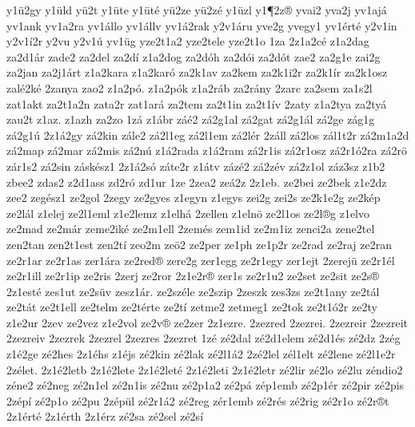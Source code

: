 {y1^^fc2gy
y1^^fcld
y^^fc2t
y1^^fcte
y1^^fct^^e9
y^^fc2ze
y^^fc2z^^e9
y1^^fczl
y1^^b62z^^ae
yvai2
yva2j
yv1aj^^e1
yv1ank
yv1a2ra
yv1^^e1llo
yv1^^e1llv
yv1^^e12rak
y2v1^^e1ru
yve2g
yvegy1
yv1^^e9rt^^e9
y2v1in
y2v1^^ed2r
y2vu
y2v1^^fa
yv1^^fcg
yze2t1a2
yze2tele
yze2t1o
1za
2z1a2c^^e9
z1a2dag
za2d1^^e1r
zade2
za2del
za2d^^ed
z1a2dog
za2d^^f3h
za2d^^f3i
za2d^^f3t
zae2
za2g1e
zai2g
za2jan
za2j1^^e1rt
z1a2kara
z1a2kar^^f3
za2k1av
za2kem
za2k1i2r
za2k1^^edr
za2k1osz
zal^^e92k^^e9
2zanya
zao2
z1a2p^^f3.
z1a2p^^f3k
z1a2r^^e1b
za2r^^e1ny
2zarc
za2sem
za1s2l
zat1akt
za2t1a2n
zata2r
zat1ar^^e1
za2tem
za2t1in
za2t1^^edv
2zaty
z1a2tya
za2ty^^e1
zau2t
z1az.
z1azh
za2zo
1z^^e1
z1^^e1br
z^^e1^^e92
z^^e12g1al
z^^e12gat
z^^e12g1^^e1l
z^^e12ge
z^^e1g1g
z^^e12g1^^fa
2z1^^e12gy
z^^e12kin
z^^e1le2
z^^e12l1eg
z^^e12l1em
z^^e12l^^e9r
2z^^e1ll
z^^e12los
z^^e1l1t2r
z^^e12m1a2d
z^^e12map
z^^e12mar
z^^e12mis
z^^e12n^^fa
z1^^e12rada
z1^^e12ram
z^^e12r1is
z^^e12r1osz
z^^e12r1^^f32ra
z^^e12r^^f6
z^^e1r1s2
z^^e12sin
z^^e1sk^^e9sz1
2z1^^e12s^^f3
z^^e1te2r
z1^^e1tv
z^^e1z^^e92
z^^e12z^^e9v
z^^e12z1ol
z^^e1z3sz
z1b2
zbee2
zdas2
z2d1ass
zd2r^^f3
zd1ur
1ze
2zea2
ze^^e12z
2z1eb.
ze2bei
ze2bek
z1e2dz
zee2
zeg^^e9sz1
ze2gol
2zegy
ze2gyes
z1egyn
z1egys
zei2g
zei2s
ze2k1e2g
ze2k^^e9p
ze2l^^e1l
z1elej
ze2l1eml
z1e2lemz
z1elh^^e1
2zellen
z1eln^^f6
ze2l1os
ze2l^^aeg
z1elvo
ze2mad
ze2m^^e1r
zeme2ik^^e9
ze2m1ell
2zem^^e9s
zem1id
ze2m1iz
zenci2a
zene2tel
zen2tan
zen2t1est
zen2t^^ed
zeo2m
ze^^f62
ze2per
ze1ph
ze1p2r
ze2rad
ze2raj
ze2ran
ze2r1ar
ze2r1as
zer1^^e1ra
ze2red^^ae
zere2g
zer1egg
ze2r1egy
zer1ejt
2zerej^^fc
ze2r1^^e9l
ze2r1ill
ze2r1ip
ze2ris
2zerj
ze2ror
2z1e2r^^ae
zer1s
ze2r1u2
ze2set
ze2sit
ze2s^^ae
2z1est^^e9
zes1ut
ze2s^^fcv
zesz1^^e1r.
ze2sz^^e9le
ze2szip
2zeszk
zes3zs
ze2t1any
ze2t^^e1l
ze2t^^e1t
ze2t1ell
ze2telm
ze2t^^e9rte
ze2t^^ed
zetme2
zetmeg1
ze2tok
ze2t1^^f32r
ze2ty
z1e2ur
2zev
ze2vez
z1e2vol
ze2v^^ae
ze2zer
2z1ezre.
2zezred
2zezrei.
2zezreir
2zezreit
2zezreiv
2zezrek
2zezrel
2zezres
2zezret
1z^^e9
z^^e92dal
z^^e92d1elem
z^^e92d1^^e9s
z^^e92dz
2z^^e9g
z1^^e92ge
z^^e92hes
2z1^^e9hs
z1^^e9js
z^^e92kin
z^^e92lak
z^^e92l1^^e12
2z^^e92lel
z^^e9l1elt
z^^e92lene
z^^e92l1e2r
2z^^e9let.
2z1^^e92letb
2z1^^e92lete
2z1^^e92let^^e9
2z1^^e92leti
2z1^^e92letr
z^^e92lir
z^^e92lo
z^^e92lu
z^^e9ndio2
z^^e9ne2
z^^e92neg
z^^e92n1el
z^^e92n1is
z^^e92nu
z^^e92p1a2
z^^e92p^^e1
z^^e9p1emb
z^^e92p1^^e9r
z^^e92pir
z^^e92pis
2z^^e9p^^ed
z^^e92p1o
z^^e92pu
2z^^e9p^^fcl
z^^e92r1^^e12
z^^e92reg
z^^e9r1emb
z^^e92r^^e9s
z^^e92rig
z^^e92r1o
z^^e92r^^aet
2z1^^e9rt^^e9
2z1^^e9rth
2z1^^e9rz
z^^e92sa
z^^e92sel
z^^e92s^^ed
}
